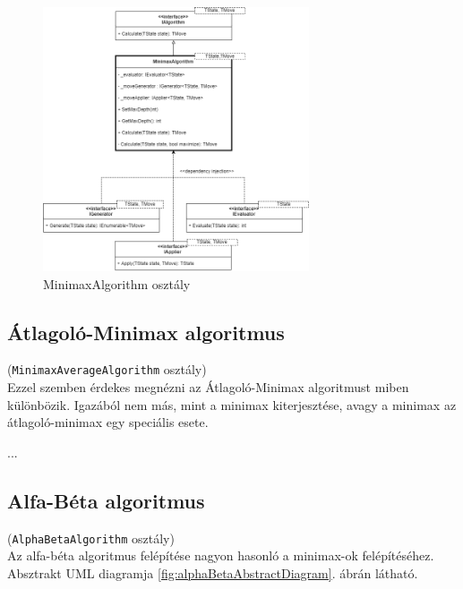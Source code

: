 \documentclass[twoside, a4paper, 12pt]{book}
\begin{document}
\begin{figure}[htbp]
	\centering
	\includegraphics[width=0.7\textwidth]{img/minimaxAbstractDiagram.png}
	\caption{MinimaxAlgorithm osztály}
	\label{fig:minimaxAbstractDiagram}
\end{figure}

\subsection{Átlagoló-Minimax algoritmus}
\noindent(\texttt{MinimaxAverageAlgorithm} osztály) \\
Ezzel szemben érdekes megnézni az Átlagoló-Minimax algoritmust miben különbözik. Igazából nem más, mint a minimax kiterjesztése, avagy a minimax az átlagoló-minimax egy speciális esete.

...

\subsection{Alfa-Béta algoritmus}
\noindent(\texttt{AlphaBetaAlgorithm} osztály) \\
Az alfa-béta algoritmus felépítése nagyon hasonló a minimax-ok felépítéséhez. Absztrakt UML diagramja \ref{fig:alphaBetaAbstractDiagram}. ábrán látható.
\end{document}
